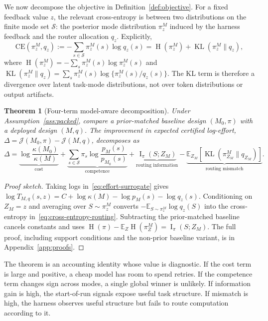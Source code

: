 \documentclass{article}
\newtheorem{theorem}{Theorem}
\DeclareMathOperator{\KL}{KL}
\DeclareMathOperator{\MI}{I}
\DeclareMathOperator{\Hent}{H}
\newcommand{\cS}{\mathcal{S}}
\newcommand{\E}{\mathbb{E}}
\newcommand{\J}{\mathcal{J}}
\begin{document}
We now decompose the objective in Definition~\ref{def:objective}.
For a fixed feedback value $z$, the relevant cross-entropy is between two distributions on the finite mode set $\cS$: the posterior mode distribution $\pi_z^M$ induced by the harness feedback and the router allocation $q_z$.
Explicitly,
\begin{equation}
  \mathrm{CE}(\pi_z^M,q_z)
  :=
  -\sum_{s\in\cS}\pi_z^M(s)\log q_z(s)
  =
  \Hent(\pi_z^M)+\KL(\pi_z^M\|q_z),
  \label{eq:cross-entropy-routing}
\end{equation}
where
$\Hent(\pi_z^M)=-\sum_s\pi_z^M(s)\log\pi_z^M(s)$ and
$\KL(\pi_z^M\|q_z)=\sum_s\pi_z^M(s)\log\{\pi_z^M(s)/q_z(s)\}$.
The KL term is therefore a divergence over latent task-mode distributions, not over token distributions or output artifacts.

\begin{theorem}[Four-term model-aware decomposition]
\label{thm:four-term}
Under Assumption~\ref{ass:packed}, compare a prior-matched baseline design $(M_0,\pi)$ with a deployed design $(M,q)$.
The improvement in expected certified log-effort,
$\Delta=\J(M_0,\pi)-\J(M,q)$, decomposes as
\begin{equation}
\label{eq:four-term}
  \Delta
  =
  \underbrace{\log\frac{\kappa(M_0)}{\kappa(M)}}_{\text{cost}}
  +
  \underbrace{\sum_{s\in\cS}\pi_s\log\frac{p_M(s)}{p_{M_0}(s)}}_{\text{competence}}
  +
  \underbrace{\MI_\pi(S;Z_M)}_{\text{routing information}}
  -
  \underbrace{\E_{Z_M}\!\left[\KL(\pi_{Z_M}^M\|q_{Z_M})\right]}_{\text{routing mismatch}} .
\end{equation}
\end{theorem}

\begin{proof}[Proof sketch]
Taking logs in~\eqref{eq:effort-surrogate} gives
$\log T_{M,q}(s,z)=C+\log\kappa(M)-\log p_M(s)-\log q_z(s)$.
Conditioning on $Z_M=z$ and averaging over $S\sim\pi_z^M$ converts
$-\E_{S\sim\pi_z^M}\log q_z(S)$ into the cross-entropy in~\eqref{eq:cross-entropy-routing}.
Subtracting the prior-matched baseline cancels constants and uses
$\Hent(\pi)-\E_Z\Hent(\pi_Z^M)=\MI_\pi(S;Z_M)$.
The full proof, including support conditions and the non-prior baseline variant, is in Appendix~\ref{app:proofs}.
\end{proof}

The theorem is an accounting identity whose value is diagnostic.
If the cost term is large and positive, a cheap model has room to spend retries.
If the competence term changes sign across modes, a single global winner is unlikely.
If information gain is high, the start-of-run signals expose useful task structure.
If mismatch is high, the harness observes useful structure but fails to route computation according to it.
\end{document}
